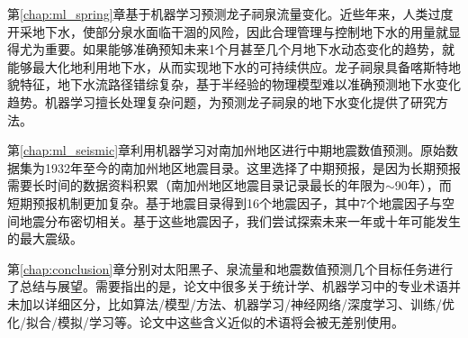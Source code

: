 第\ref{chap:ml_spring}章基于机器学习预测龙子祠泉流量变化。近些年来，人类过度开采地下水，使部分泉水面临干涸的风险，因此合理管理与控制地下水的用量就显得尤为重要。如果能够准确预知未来1个月甚至几个月地下水动态变化的趋势，就能够最大化地利用地下水，从而实现地下水的可持续供应。龙子祠泉具备喀斯特地貌特征，地下水流路径错综复杂，基于半经验的物理模型难以准确预测地下水变化趋势。机器学习擅长处理复杂问题，为预测龙子祠泉的地下水变化提供了研究方法。

第\ref{chap:ml_seismic}章利用机器学习对南加州地区进行中期地震数值预测。原始数据集为1932年至今的南加州地区地震目录。这里选择了中期预报，是因为长期预报需要长时间的数据资料积累（南加州地区地震目录记录最长的年限为$\sim$90年），而短期预报机制更加复杂。基于地震目录得到16个地震因子，其中7个地震因子与空间地震分布密切相关。基于这些地震因子，我们尝试探索未来一年或十年可能发生的最大震级。

第\ref{chap:conclusion}章分别对太阳黑子、泉流量和地震数值预测几个目标任务进行了总结与展望。需要指出的是，论文中很多关于统计学、机器学习中的专业术语并未加以详细区分，比如算法/模型/方法、机器学习/神经网络/深度学习、训练/优化/拟合/模拟/学习等。论文中这些含义近似的术语将会被无差别使用。
